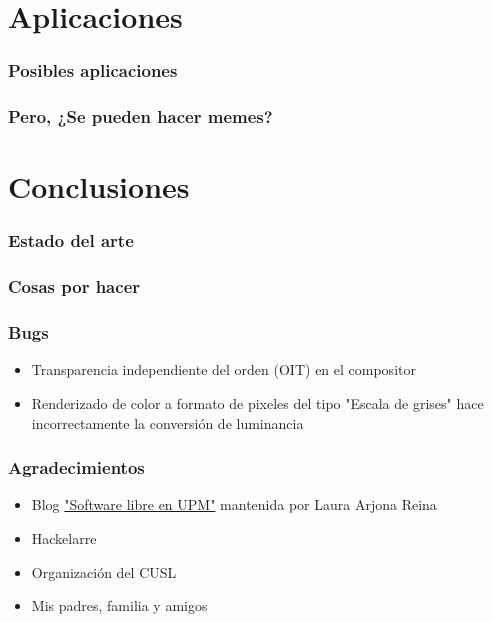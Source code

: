 \documentclass{beamer}
\begin{document}
%
%
\section{Aplicaciones}

\begin{frame} \frametitle{Posibles aplicaciones}
\end{frame}

\begin{frame} \frametitle{Pero, ¿Se pueden hacer memes?}
\end{frame}

%
%
\section{Conclusiones}

\begin{frame} \frametitle{Estado del arte}
\end{frame}

\begin{frame} \frametitle{Cosas por hacer}
\end{frame}

\begin{frame} \frametitle{Bugs}
	\begin{itemize}
		\item{Transparencia independiente del orden (OIT) en el compositor}
		\item{Renderizado de color a formato de pixeles del tipo "Escala de grises" hace incorrectamente la conversión de luminancia}
	\end{itemize}
\end{frame}

\begin{frame} \frametitle{Agradecimientos}
	\begin{itemize}
		\item{Blog \href{http://blogs.upm.es/softwarelibre/}{"Software libre en UPM"} mantenida por Laura Arjona Reina}
		\item{Hackelarre}
		\item{Organización del CUSL}
		\item{Mis padres, familia y amigos}
	\end{itemize}
\end{frame}
\end{document}
